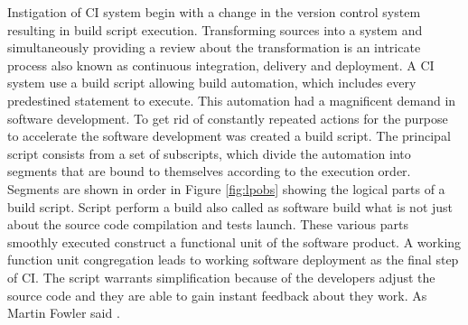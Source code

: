 Instigation of CI system begin with a change in the version control system resulting in build script execution. Transforming sources into a system and simultaneously providing a review about the transformation is an intricate process also known as continuous integration, delivery and deployment. A CI system use a build script allowing build automation, which includes every predestined statement to execute. This automation had a magnificent demand in software development. To get rid of constantly repeated actions for the purpose to accelerate the software development was created a build script. The principal script consists from a set of subscripts, which divide the automation into segments that are bound to themselves according to the execution order. Segments are shown in order in Figure \ref{fig:lpobs} showing the logical parts of a build script. Script perform a build also called as software build what is not just about the source code compilation and tests launch. These various parts smoothly executed construct a functional unit of the software product. A working function unit congregation leads to working software deployment as the final step of CI. The script warrants simplification because of the developers adjust the source code and they are able to gain instant feedback about they work. As Martin Fowler said \cite{CIMF}.

